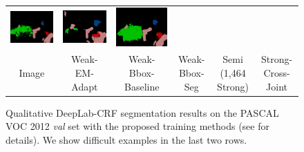 \begin{figure}[p]
{\begin{tabular}{c c c c c c}
    \includegraphics[height=0.11\linewidth]{fig/val_crf_vis/bbox_crf/2007_001175.png} &
    \includegraphics[height=0.11\linewidth]{fig/val_crf_vis/strongweak/2007_001175.png} &
    \includegraphics[height=0.11\linewidth]{fig/val_crf_vis/cocomix/2007_001175.png} \\
    {\footnotesize Image} & {\footnotesize Weak-EM-Adapt} & {\footnotesize
      Weak-Bbox-Baseline} & {\footnotesize Weak-Bbox-Seg} & {\footnotesize
      Semi (1,464 Strong)} & {\footnotesize Strong-Cross-Joint} \\
  \end{tabular}
  }
  \caption{Qualitative DeepLab-CRF segmentation results on the PASCAL
    VOC 2012 \textsl{val} set with the proposed training methods (see
     for details). We show difficult
    examples in the last two rows.}
  \label{fig:ValResults}
\end{figure}

